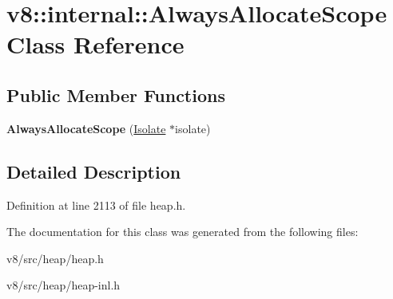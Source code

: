 \hypertarget{classv8_1_1internal_1_1AlwaysAllocateScope}{}\section{v8\+:\+:internal\+:\+:Always\+Allocate\+Scope Class Reference}
\label{classv8_1_1internal_1_1AlwaysAllocateScope}
\subsection*{Public Member Functions}
\begin{DoxyCompactItemize}
\item 
\mbox{\label{classv8_1_1internal_1_1AlwaysAllocateScope_a34c521892b9b7d7b65feb1c9e56bddf0}} 
{\bfseries Always\+Allocate\+Scope} (\mbox{\hyperlink{classv8_1_1internal_1_1Isolate}{Isolate}} $\ast$isolate)
\end{DoxyCompactItemize}


\subsection{Detailed Description}


Definition at line 2113 of file heap.\+h.



The documentation for this class was generated from the following files\+:\begin{DoxyCompactItemize}
\item 
v8/src/heap/heap.\+h\item 
v8/src/heap/heap-\/inl.\+h\end{DoxyCompactItemize}
